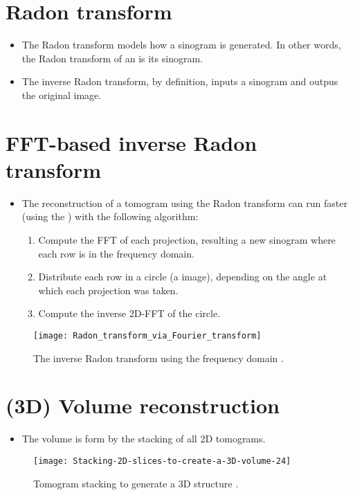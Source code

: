 \section{Radon transform}
\begin{itemize}
\item The Radon transform models how a sinogram is generated. In other
  words, the Radon transform of an  is
  its sinogram.
\item The inverse Radon transform, by definition, inputs a sinogram
  and outpus the original image.
\end{itemize}

\section{FFT-based inverse Radon transform}
\begin{itemize}
\item The reconstruction of a tomogram using the Radon transform can
  run faster (using the ) with the following algorithm:
  \begin{enumerate}
  \item Compute the FFT of each projection, resulting a new sinogram
    where each row is in the frequency domain.
  \item Distribute each row in a circle (a image), depending on the
    angle at which each projection was taken.
  \item Compute the inverse 2D-FFT of the circle.
  \end{enumerate}
\end{itemize}
\vspace{-4ex}
\begin{figure}[!b]
  \centering
  \texttt{[image: Radon\_transform\_via\_Fourier\_transform]}
  \caption{The inverse Radon transform using the frequency domain
    \cite{wikipedia2025radom_transform}.\label{fig:inverse_Radon}}
\end{figure}

\section{(3D) Volume reconstruction}
\begin{itemize}
\item The volume is form by the stacking of all 2D tomograms.
\end{itemize}
\vspace{-4ex}
\begin{figure}[!b]
  \centering
  \texttt{[image: Stacking-2D-slices-to-create-a-3D-volume-24]}
  \caption{Tomogram stacking to generate a 3D structure
    \cite{alzu2019multi}.\label{fig:stacking}}
\end{figure}

